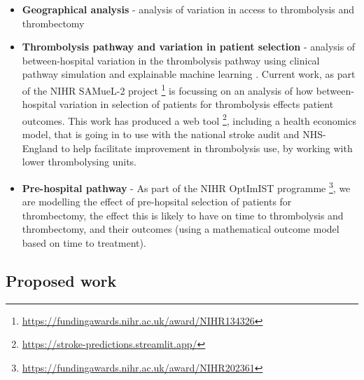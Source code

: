 \begin{itemize}
    \item \textbf{Geographical analysis} - analysis of variation in access to thrombolysis and thrombectomy \cite{allen_maximising_2019}

    \item \textbf{Thrombolysis pathway and variation in patient selection} - analysis of between-hospital variation in the thrombolysis pathway using clinical pathway simulation and explainable machine learning \cite{allen_use_2022, pearn_what_2023}. Current work, as part of the NIHR SAMueL-2 project \footnote{\url{https://fundingawards.nihr.ac.uk/award/NIHR134326}} is focussing on an analysis of how between-hospital variation in selection of patients for thrombolysis effects patient outcomes. This work has produced a web tool \footnote{\url{https://stroke-predictions.streamlit.app/}}, including a health economics model, that is going in to use with the national stroke audit and NHS-England to help facilitate improvement in thrombolysis use, by working with lower thrombolysing units.

    \item \textbf{Pre-hospital pathway} - As part of the NIHR OptImIST programme \footnote{\url{https://fundingawards.nihr.ac.uk/award/NIHR202361}}, we are modelling the effect of pre-hopsital selection of patients for thrombectomy, the effect this is likely to have on time to thrombolysis and thrombectomy, and their outcomes (using a mathematical outcome model based on time to treatment).
    
\end{itemize}

\subsection*{Proposed work}

